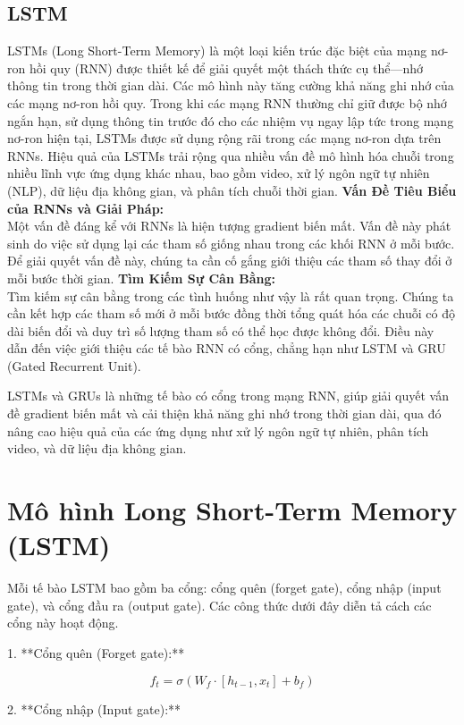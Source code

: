 \documentclass[conference]{IEEEtran}
\begin{document}
	\subsection{LSTM}
	LSTMs (Long Short-Term Memory) là một loại kiến trúc đặc biệt của mạng nơ-ron hồi quy (RNN) được thiết kế để giải quyết một thách thức cụ thể—nhớ thông tin trong thời gian dài. Các mô hình này tăng cường khả năng ghi nhớ của các mạng nơ-ron hồi quy. Trong khi các mạng RNN thường chỉ giữ được bộ nhớ ngắn hạn, sử dụng thông tin trước đó cho các nhiệm vụ ngay lập tức trong mạng nơ-ron hiện tại, LSTMs được sử dụng rộng rãi trong các mạng nơ-ron dựa trên RNNs. Hiệu quả của LSTMs trải rộng qua nhiều vấn đề mô hình hóa chuỗi trong nhiều lĩnh vực ứng dụng khác nhau, bao gồm video, xử lý ngôn ngữ tự nhiên (NLP), dữ liệu địa không gian, và phân tích chuỗi thời gian.
	\textbf{Vấn Đề Tiêu Biểu của RNNs và Giải Pháp:}\\
	Một vấn đề đáng kể với RNNs là hiện tượng gradient biến mất. Vấn đề này phát sinh do việc sử dụng lại các tham số giống nhau trong các khối RNN ở mỗi bước. Để giải quyết vấn đề này, chúng ta cần cố gắng giới thiệu các tham số thay đổi ở mỗi bước thời gian.
	\textbf{Tìm Kiếm Sự Cân Bằng:}\\
	Tìm kiếm sự cân bằng trong các tình huống như vậy là rất quan trọng. Chúng ta cần kết hợp các tham số mới ở mỗi bước đồng thời tổng quát hóa các chuỗi có độ dài biến đổi và duy trì số lượng tham số có thể học được không đổi. Điều này dẫn đến việc giới thiệu các tế bào RNN có cổng, chẳng hạn như LSTM và GRU (Gated Recurrent Unit).
	
	LSTMs và GRUs là những tế bào có cổng trong mạng RNN, giúp giải quyết vấn đề gradient biến mất và cải thiện khả năng ghi nhớ trong thời gian dài, qua đó nâng cao hiệu quả của các ứng dụng như xử lý ngôn ngữ tự nhiên, phân tích video, và dữ liệu địa không gian.
	\section*{Mô hình Long Short-Term Memory (LSTM)}
	
	Mỗi tế bào LSTM bao gồm ba cổng: cổng quên (forget gate), cổng nhập (input gate), và cổng đầu ra (output gate). Các công thức dưới đây diễn tả cách các cổng này hoạt động.
	
	1. **Cổng quên (Forget gate):**
	
	\[
	f_t = \sigma(W_f \cdot [h_{t-1}, x_t] + b_f)
	\]
	
	2. **Cổng nhập (Input gate):**
	
\end{document}
